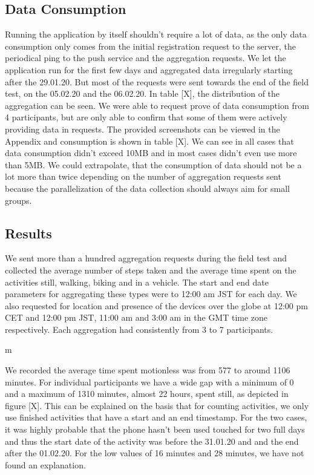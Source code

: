 \subsection{Data Consumption}
Running the application by itself shouldn't require a lot of data, as the only data consumption only comes from the initial registration request to the server, the periodical ping to the push service and the aggregation requests. We let the application run for the first few days and aggregated data irregularly starting after the 29.01.20. But most of the requests were sent towards the end of the field test, on the 05.02.20 and the 06.02.20. In table [X], the distribution of the aggregation can be seen. We were able to request prove of data consumption from 4 participants, but are only able to confirm that some of them were actively providing data in requests. The provided screenshots can be viewed in the Appendix and consumption is shown in table [X]. 
We can see in all cases that data consumption didn't exceed 10MB and in most cases didn't even use more than 5MB. We could extrapolate, that the consumption of data should not be a lot more than twice depending on the number of aggregation requests sent because the parallelization of the data collection should always aim for small groups.

\subsection{Results}
We sent more than a hundred aggregation requests during the field test and collected the average number of steps taken and the average time spent on the activities still, walking, biking and in a vehicle. The start and end date parameters for aggregating these types were to 12:00 am JST for each day. We also requested for location and presence of the devices over the globe at 12:00 pm CET and 12:00 pm JST, 11:00 am and 3:00 am in the GMT time zone respectively. Each aggregation had consistently from 3 to 7 participants.

m%

We recorded the average time spent motionless was from 577 to around 1106 minutes. For individual participants we have a wide gap with a minimum of 0 and a maximum of 1310 minutes, almost 22 hours, spent still, as depicted in figure [X]. This can be explained on the basis that for counting activities, we only use finished activities that have a start and an end timestamp. For the two cases, it was highly probable that the phone hasn't been used touched for two full days and thus the start date of the activity was before the 31.01.20 and and the end after the 01.02.20. For the low values of 16 minutes and 28 minutes, we have not found an explanation. 

